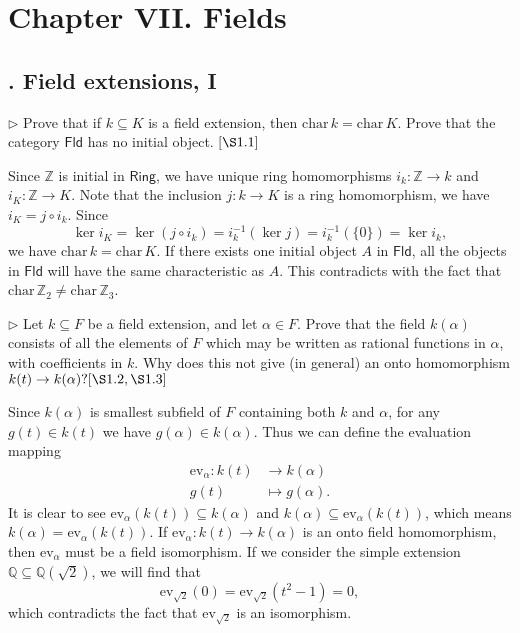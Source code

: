 \section{Chapter VII.\hspace{0.2em} Fields}
\subsection{. Field extensions, I}
\begin{problem}[1.1]
$\triangleright$ Prove that if $k \subseteq K$ is a field extension, then $\mathrm{char}\,k=\mathrm{char}\,K$. Prove that the category $\mathsf{Fld}$ has no initial object. $[\S 1.1]$
\end{problem}
\begin{solution}
	Since $\mathbb{Z}$ is initial in $\mathsf{Ring}$, we have unique ring homomorphisms $i_k: \mathbb{Z} \rightarrow k$ and $i_K: \mathbb{Z} \rightarrow K$. Note that the inclusion $j:k\rightarrow K$ is a ring homomorphism, we have $i_K=j\circ i_k$. Since
	\[
	\ker i_K=\ker(j\circ i_k)=i_{k}^{-1}(\ker j)=i_{k}^{-1}(\{0\})=\ker i_k,
	\]
	we have $\mathrm{char}\,k=\mathrm{char}\,K$. If there exists one initial object $A$ in $\mathsf{Fld}$, all the objects in $\mathsf{Fld}$ will have the same characteristic as $A$. This contradicts with the fact that $\mathrm{char}\,{\mathbb{Z}}_2 \ne \mathrm{char}\,\mathbb{Z}_3$.
\end{solution}

\begin{problem}[1.3]
$\triangleright$ Let $k \subseteq F$ be a field extension, and let $\alpha \in F .$ Prove that the field $k(\alpha)$ consists of all the elements of $F$ which may be written as rational functions in $\alpha$, with coefficients in $k$. Why does this not give (in general) an onto homomorphism $k(t) \rightarrow k(\alpha) ?[\S 1.2, \S 1.3]$
\end{problem}
\begin{solution}
Since $k(\alpha)$ is smallest subfield of $F$ containing both $k$ and $\alpha$, for any $g(t)\in k(t)$ we have $g(\alpha)\in k(\alpha)$. Thus we can define the evaluation mapping
\begin{align*}
	\mathrm{ev}_{\alpha}:k(t) &\longrightarrow k(\alpha)\\
	g(t)&\longmapsto g(\alpha).
\end{align*}
It is clear to see $\mathrm{ev}_{\alpha}(k(t))\subseteq k(\alpha)$ and $k(\alpha)\subseteq \mathrm{ev}_{\alpha}(k(t))$, which means $k(\alpha)= \mathrm{ev}_{\alpha}(k(t))$.
If $\mathrm{ev}_{\alpha}:k(t) \rightarrow k(\alpha)$ is an onto field homomorphism, then $\mathrm{ev}_{\alpha}$ must be a field isomorphism. If we consider the simple extension $\mathbb{Q}\subseteq\mathbb{Q}(\sqrt{2})$, we will find that  
\[
\mathrm{ev}_{\sqrt{2}}(0)=\mathrm{ev}_{\sqrt{2}}(t^2-1)=0,
\]
which contradicts the fact that $\mathrm{ev}_{\sqrt{2}}$ is an isomorphism.
\end{solution}



